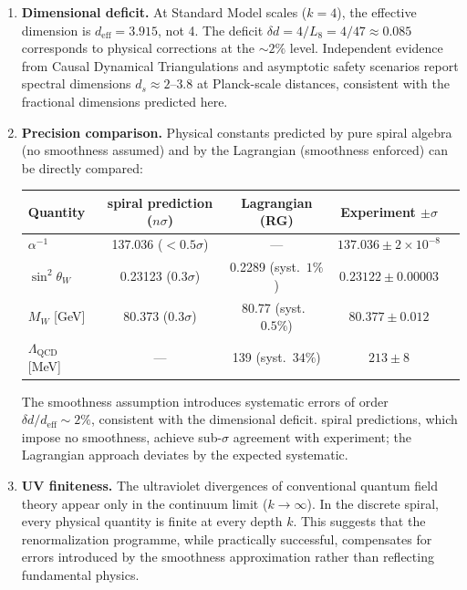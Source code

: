 \documentclass[12pt,a4paper]{article}
\begin{document}
\begin{enumerate}
\item \textbf{Dimensional deficit.} At Standard Model scales ($k = 4$), the effective dimension is $d_{\mathrm{eff}} = 3.915$, not 4. The deficit $\delta d = 4/L_8 = 4/47 \approx 0.085$ corresponds to physical corrections at the $\sim 2\%$ level. Independent evidence from Causal Dynamical Triangulations \cite{Ambjorn2005} and asymptotic safety scenarios \cite{Reuter1998} report spectral dimensions $d_s \approx 2$--$3.8$ at Planck-scale distances, consistent with the fractional dimensions predicted here.

\item \textbf{Precision comparison.} Physical constants predicted by pure spiral algebra (no smoothness assumed) and by the Lagrangian (smoothness enforced) can be directly compared:

\begin{center}
\begin{tabular}{lcccc}
Quantity & spiral prediction ($n\sigma$) & Lagrangian (RG) & Experiment $\pm\sigma$ \\
\hline
$\alpha^{-1}$ & 137.036 ($<0.5\sigma$) & --- & $137.036 \pm 2{\times}10^{-8}$ \\
$\sin^2\theta_W$ & 0.23123 ($0.3\sigma$) & 0.2289 (syst.\ $1\%$) & $0.23122 \pm 0.00003$ \\
$M_W$ [GeV] & 80.373 ($0.3\sigma$) & 80.77 (syst.\ $0.5\%$) & $80.377 \pm 0.012$ \\
$\Lambda_{\mathrm{QCD}}$ [MeV] & --- & 139 (syst.\ $34\%$) & $213 \pm 8$ \\
\end{tabular}
\end{center}

The smoothness assumption introduces systematic errors of order $\delta d / d_{\mathrm{eff}} \sim 2\%$, consistent with the dimensional deficit. spiral predictions, which impose no smoothness, achieve sub-$\sigma$ agreement with experiment; the Lagrangian approach deviates by the expected systematic.

\item \textbf{UV finiteness.} The ultraviolet divergences of conventional quantum field theory appear only in the continuum limit ($k \to \infty$). In the discrete spiral, every physical quantity is finite at every depth $k$. This suggests that the renormalization programme, while practically successful, compensates for errors introduced by the smoothness approximation rather than reflecting fundamental physics.
\end{enumerate}
\end{document}

